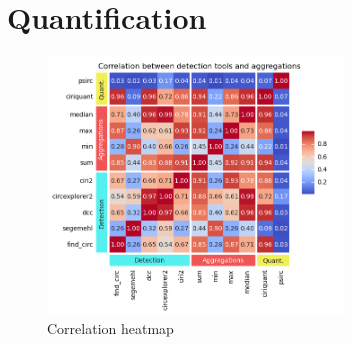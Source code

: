 \section{Quantification}

\begin{figure}[ht]
    \centering

    \includegraphics[width=0.7\textwidth]{chapters/4_results_and_discussion/figures/quantification/correlation_heatmap.png}
    \caption{Correlation heatmap
    }
    \label{fig:quantification_correlation_heatmap}
\end{figure}